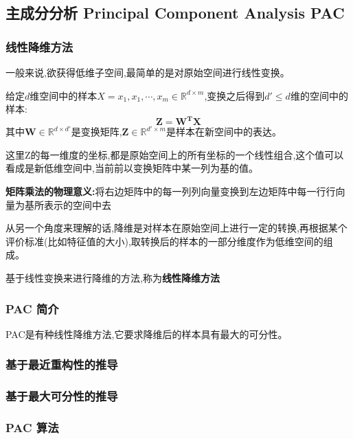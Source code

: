 \documentclass[UTF8,a4paper]{ctexart}%
\begin{document}
      \subsection{主成分分析 Principal Component Analysis PAC}
          \subsubsection{线性降维方法}
              一般来说,欲获得低维子空间,最简单的是对原始空间进行线性变换。

              给定$d$维空间中的样本$X = {x_1,x_1,\cdots ,x_m} \in \mathbb{R}^{d\times m }$,变换之后得到$d' \leqslant d$维的空间中的样本:
              \begin{equation}
                \mathbf{Z = W^TX}
              \end{equation}
              其中$\mathbf{W}\in \mathbb{R}^{d\times d'}$是变换矩阵,$\mathbf{Z}\in \mathbb{R}^{d' \times m}$是样本在新空间中的表达。

              {\color{blue}
                  这里Z的每一维度的坐标,都是原始空间上的所有坐标的一个线性组合,这个值可以看成是新低维空间中,当前前以变换矩阵中某一列为基的值。

                  \textbf{矩阵乘法的物理意义:}将右边矩阵中的每一列列向量变换到左边矩阵中每一行行向量为基所表示的空间中去

                  从另一个角度来理解的话,降维是对样本在原始空间上进行一定的转换,再根据某个评价标准(比如特征值的大小),取转换后的样本的一部分维度作为低维空间的组成。
              }

              基于线性变换来进行降维的方法,称为\textbf{线性降维方法}
          \subsubsection{PAC 简介}
              PAC是有种线性降维方法,它要求降维后的样本具有最大的可分性。

          \subsubsection{基于最近重构性的推导}

          \subsubsection{基于最大可分性的推导}

          \subsubsection{PAC 算法}
\end{document}
